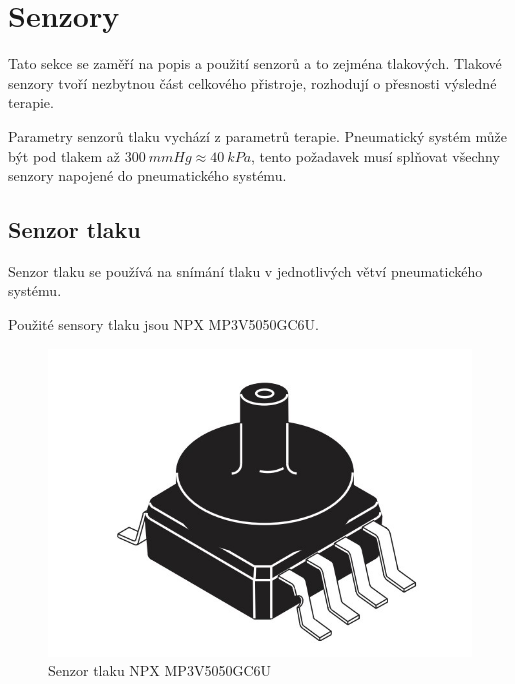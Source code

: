\section{Senzory}
Tato sekce se zaměří na popis a použití senzorů a to zejména tlakových. Tlakové senzory tvoří nezbytnou část celkového přistroje, rozhodují o přesnosti výsledné terapie. \par
Parametry senzorů tlaku vychází z parametrů terapie. Pneumatický systém může být pod tlakem až $300 \ mmHg \approx 40 \ kPa$, tento požadavek musí splňovat všechny senzory napojené do pneumatického systému.

\subsection{Senzor tlaku} \label{section:pressure_sen}
Senzor tlaku se používá na snímání tlaku v jednotlivých větví pneumatického systému. \par

Použité sensory tlaku jsou NPX MP3V5050GC6U.

\begin{figure}[H]
    \centering
    \includegraphics[width=0.5\linewidth]{pictures/nxp_sensor.jpg}
    \caption{Senzor tlaku NPX MP3V5050GC6U \cite{cite:NXP}}
    \label{fig:nxp}
\end{figure}

